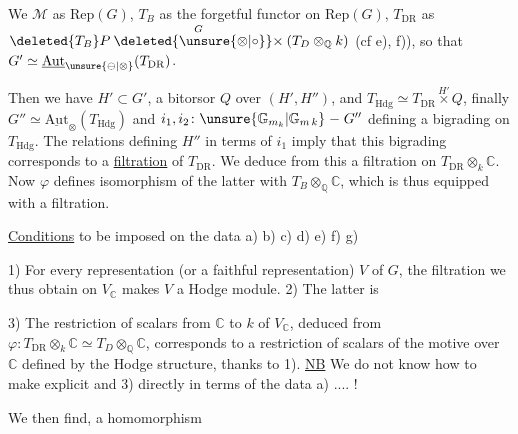  We  $\mathcal M$ as $\mathrm{Rep}(G)$, $T_B$  as the forgetful functor on $\mathrm{Rep}(G)$, $T_{\mathrm{DR}}$ as $\deleted{T_B}P\overset{G}{\deleted{\unsure{\otimes|\circ}}\times}(T_D\otimes_{\mathbb Q}k)$ (cf e), f)),  so that $G'\simeq\underline{\mathrm{Aut}}_{\unsure{\ominus|\otimes}}(T_{\mathrm{DR}})$.


Then we have $H'\subset G'$, a bitorsor $Q$ over $(H',H'')$,  and $T_{\mathrm{Hdg}}\simeq T_{\mathrm{DR}}\overset{H'}{\times}Q$, finally  $G''\simeq\underline{\mathrm{Aut}}_{\otimes}(T_{\mathrm{Hdg}})$ and $i_1,i_2\colon \unsure{\mathbb G_{m_k}|\mathbb G_{m\,k}}\mathrel{-}G''$ defining a bigrading on $T_{\mathrm{Hdg}}$. The relations  defining $H''$ in terms of $i_1$ imply that this bigrading corresponds to a  \uline{filtration} of $T_{\mathrm{DR}}$. We deduce from this a filtration on $T_{\mathrm{DR}}\otimes_k\mathbb C$. Now $\varphi$ defines  isomorphism of the latter with $T_B\otimes_{\mathbb Q}\mathbb C$, which is thus equipped with a filtration.

\uline{Conditions} to be imposed on the data a) b) c) d) e) f) g)

 1) For every representation (or a faithful representation) $V$ of $G$, the filtration we thus obtain on $V_{\mathbb C}$  makes $V$ a Hodge module. 2) The latter is 

3) The restriction of scalars from $\mathbb C$ to $k$ of $V_{\mathbb C}$, deduced from $\varphi\colon T_{\mathrm{DR}}\otimes_k\mathbb C\simeq T_D\otimes_{\mathbb Q}\mathbb C$, corresponds to a restriction of scalars of the motive over $\mathbb C$ defined by the Hodge structure, thanks to 1). \uline{NB} We do not know how to make explicit  and 3)  directly in terms of the data a) .... !

We then find,  a homomorphism
{\centering %
\textit{ }\par}
